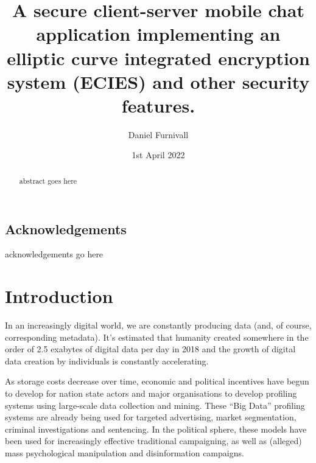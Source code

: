 \documentclass{mproj}
\begin{document}

\title{A secure client-server mobile chat application implementing an elliptic curve integrated encryption system (ECIES) and other security features.}
\author{Daniel Furnivall}
\date{1st April 2022}
\maketitle

\begin{abstract}
abstract goes here
\end{abstract}

\educationalconsent


\newpage
\section*{Acknowledgements}

acknowledgements go here

\tableofcontents


\chapter{Introduction}\label{intro} \setcounter{page}{1} 

In an increasingly digital world, we are constantly producing data (and, of course, corresponding metadata). It's estimated that humanity created somewhere in the order of 2.5 exabytes of digital data per day in 2018\cite{baeza2022attention} and the growth of digital data creation by individuals is constantly accelerating.\cite{baeza2022attention} 

As storage costs decrease over time\cite{walter2005kryder}, economic and political incentives have begun to develop for nation state actors and major organisations to develop profiling systems using large-scale data collection and mining. These ``Big Data'' profiling systems are already being used for targeted advertising\cite{farahat2012effective}, market segmentation\cite{pantelis2013understanding}, criminal investigations\cite{zawoad2015digital} and sentencing\cite{simmons2017big}. In the political sphere, these models have been used for increasingly effective traditional campaigning, \cite{kreiss2019arbiters} as well as (alleged) mass psychological manipulation\cite{berghel2018malice} and disinformation\cite{stocker2019facebook} campaigns.
\end{document}
